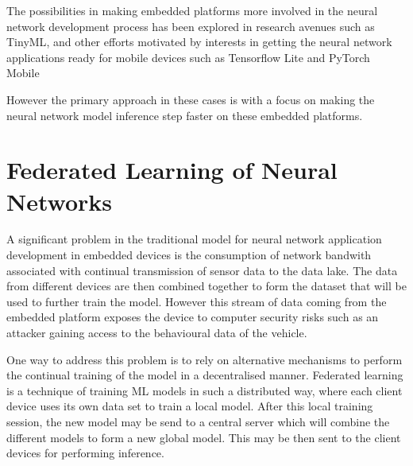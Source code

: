 The possibilities in making embedded platforms more involved in the neural network development process has been explored in research avenues such as TinyML\cite{tinyml}, and other efforts motivated by interests in getting the neural network applications ready for mobile devices such as Tensorflow Lite\cite{tfl} and PyTorch Mobile \cite{pytorch-mobile}

However the primary approach in these cases is with a focus on making the neural network model inference step faster on these embedded platforms.

\section{Federated Learning of Neural Networks}

A significant problem in the traditional model for neural network application development in embedded devices is the consumption of network bandwith associated with continual transmission of sensor data to the data lake. The data from different devices are then combined together to form the dataset that will be used to further train the model. However this stream of data coming from the embedded platform exposes the device to computer security risks such as an attacker gaining access to the behavioural data of the vehicle.

\begin{figure}[h]
	\centering
\end{figure}

One way to address this problem is to rely on alternative mechanisms to perform the continual training of the model in a decentralised manner. Federated learning is a technique of training ML models in such a distributed way, where each client device uses its own data set to train a local model. After this local training session, the new model may be send to a central server which will combine the different models to form a new global model. This may be then sent to the client devices for performing inference.

